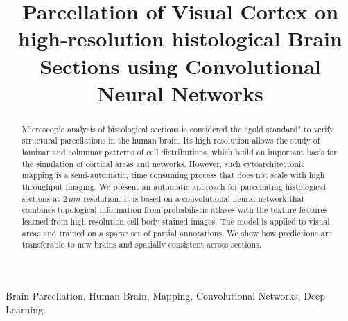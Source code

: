 \documentclass{article}
\title{Parcellation of Visual Cortex on high-resolution histological Brain Sections using Convolutional Neural Networks}
\begin{document}
%
\maketitle
%
\begin{abstract}
	Microscopic analysis of histological sections is considered the ``gold standard" to verify structural parcellations in the human brain.
	Its high resolution allows the study of laminar and columnar patterns of cell distributions, which build an important basis for the simulation of cortical areas and networks.
	However, such cytoarchitectonic mapping is a semi-automatic, time consuming process that does not scale with high throughput imaging.
	We present an automatic approach for parcellating histological sections at $2\,\mu m$ resolution.
	It is based on a convolutional neural network that combines topological information from probabilistic atlases with the texture features learned from high-resolution cell-body stained images.
	The model is applied to visual areas and trained on a sparse set of partial annotations. We show how predictions are transferable to new brains and spatially consistent across sections.


\end{abstract}
%
\begin{keywords}
Brain Parcellation, Human Brain, Mapping, Convolutional Networks, Deep Learning.
\end{keywords}
%
\end{document}

